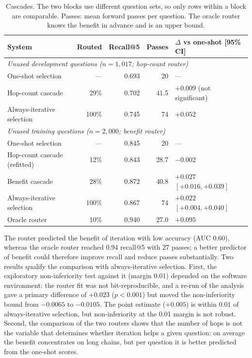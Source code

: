 \begin{table}[htbp]
\centering
\caption{Cascades. The two blocks use different question sets, so only rows within a block are comparable. Passes: mean forward passes per question. The oracle router knows the benefit in advance and is an upper bound.}
\label{tab:cascade}
\small
\begin{tabular}{lrrrl}
\toprule
System & Routed & Recall@5 & Passes & $\Delta$ vs one-shot [95\% CI] \\
\midrule
\multicolumn{5}{l}{\emph{Unused development questions ($n=1{,}017$; hop-count router)}} \\
One-shot selection & --- & 0.693 & 20 & --- \\
Hop-count cascade & 29\% & 0.702 & 41.5 & $+0.009$ (not significant) \\
Always-iterative selection & 100\% & 0.745 & 74 & $+0.052$ \\
\midrule
\multicolumn{5}{l}{\emph{Unused training questions ($n=2{,}000$; benefit router)}} \\
One-shot selection & --- & 0.845 & 20 & --- \\
Hop-count cascade (refitted) & 12\% & 0.843 & 28.7 & $-0.002$ \\
Benefit cascade & 28\% & 0.872 & 40.8 & $+0.027$ $[+0.016, +0.039]$ \\
Always-iterative selection & 100\% & 0.867 & 74 & $+0.022$ $[+0.004, +0.040]$ \\
Oracle router & 10\% & 0.940 & 27.0 & $+0.095$ \\
\bottomrule
\end{tabular}
\end{table}

The router predicted the benefit of iteration with low accuracy (AUC 0.60), whereas the oracle router reached 0.94 recall@5 with 27 passes; a better predictor of benefit could therefore improve recall and reduce passes substantially. Two results qualify the comparison with always-iterative selection. First, the exploratory non-inferiority test against it (margin 0.01) depended on the software environment: the router fit was not bit-reproducible, and a re-run of the analysis gave a primary difference of $+0.023$ ($p<0.001$) but moved the non-inferiority bound from $-0.0065$ to $-0.0105$. The point estimate ($+0.005$) is within 0.01 of always-iterative selection, but non-inferiority at the 0.01 margin is not robust. Second, the comparison of the two routers shows that the number of hops is not the variable that determines whether iteration helps a given question: on average the benefit concentrates on long chains, but per question it is better predicted from the one-shot scores.

